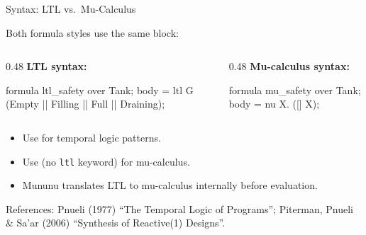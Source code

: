\begin{frame}[fragile]{Syntax: LTL vs.\ Mu-Calculus}

Both formula styles use the same  block:

\begin{columns}[t]
\begin{column}{0.48\textwidth}
\textbf{LTL syntax:}
\begin{ctxdslcode}
formula ltl_safety {
    over Tank;
    body = ltl G (Empty || Filling
                || Full || Draining);
}
\end{ctxdslcode}
\end{column}
\begin{column}{0.48\textwidth}
\textbf{Mu-calculus syntax:}
\begin{ctxdslcode}
formula mu_safety {
    over Tank;
    body = nu X. ([] X);
}
\end{ctxdslcode}
\end{column}
\end{columns}

\vspace{1em}
\begin{itemize}
  \item Use  for temporal logic patterns.
  \item Use  (no \texttt{ltl} keyword) for mu-calculus.
  \item Mununu translates LTL to mu-calculus internally before evaluation.
\end{itemize}

\medskip
{\scriptsize\color{ubaGray} References: Pnueli (1977) ``The Temporal Logic of Programs''; Piterman, Pnueli \& Sa'ar (2006) ``Synthesis of Reactive(1) Designs''.}

\end{frame}


